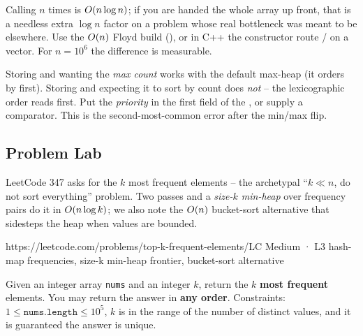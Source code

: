 \begin{warningbox}
Calling  $n$ times is $O(n\log n)$; if you are handed the whole array up front, that is a
needless extra $\log n$ factor on a problem whose real bottleneck was meant to be elsewhere. Use the
$O(n)$ Floyd build (), or in C++ the constructor
 route /  on a vector. For $n=10^{6}$
the difference is measurable.
\end{warningbox}

\begin{warningbox}
Storing  and wanting the \emph{max count} works with the default max-heap (it
orders by  first). Storing  and expecting it to sort by count does
\emph{not} -- the lexicographic order reads  first. Put the \emph{priority} in the first field
of the , or supply a comparator. This is the second-most-common  error
after the min/max flip.
\end{warningbox}

\subsection{Problem Lab}

LeetCode 347 asks for the $k$ most frequent elements -- the archetypal ``$k \ll n$, do not sort everything''
problem. Two passes and a \emph{size-$k$ min-heap} over frequency pairs do it in $O(n\log k)$; we also
note the $O(n)$ bucket-sort alternative that sidesteps the heap when values are bounded.

  {https://leetcode.com/problems/top-k-frequent-elements/}{LC Medium · L3}
  {hash-map frequencies, size-k min-heap frontier, bucket-sort alternative}

\begin{problemstatement}
Given an integer array \texttt{nums} and an integer $k$, return the $k$ \textbf{most frequent} elements. You
may return the answer in \textbf{any order}. Constraints: $1 \le \texttt{nums.length} \le 10^{5}$, $k$ is in
the range of the number of distinct values, and it is guaranteed the answer is unique.
\end{problemstatement}

